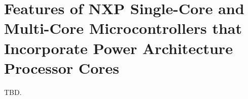 \section{Features of NXP\textsuperscript{\textregistered} Single-Core and
         Multi-Core Microcontrollers that Incorporate
         Power Architecture\textsuperscript{\textregistered} Processor Cores}
\label{sndv0}

TBD.
